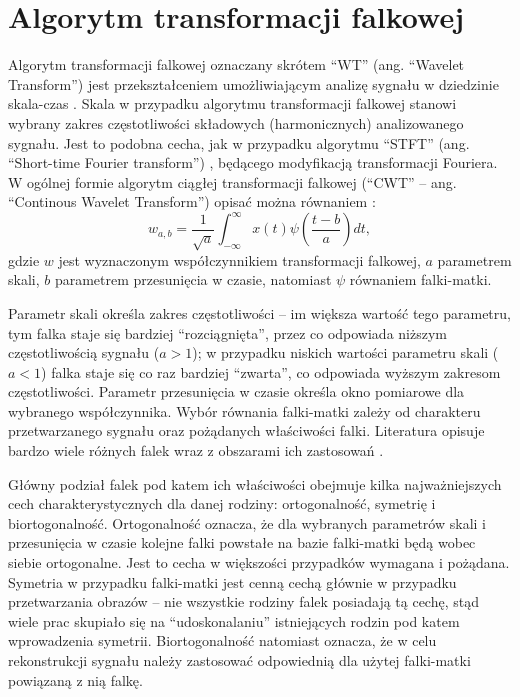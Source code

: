\chapter{Algorytm transformacji falkowej}

Algorytm transformacji falkowej oznaczany skrótem \enquote{WT} (ang. \enquote{Wavelet Transform}) jest przekształceniem umożliwiającym analizę sygnału w dziedzinie skala-czas \cite{wallen_handbook}. Skala w przypadku algorytmu transformacji falkowej stanowi wybrany zakres częstotliwości składowych (harmonicznych) analizowanego sygnału. Jest to podobna cecha, jak w przypadku algorytmu \enquote{STFT} (ang. \enquote{Short-time Fourier transform}) \cite{durak_sftp}, będącego modyfikacją transformacji Fouriera. W ogólnej formie algorytm ciągłej transformacji falkowej (\enquote{CWT} -- ang. \enquote{Continous Wavelet Transform}) opisać można równaniem \cite{lord_guide, wallen_handbook}:
\begin{equation}
w_{a,b} = \frac{1}{\sqrt{a}} \int _{-\infty} ^{\infty} { x(t) \psi \left( \frac{t-b}{a} \right) } dt \label{eqn_cwt},
\end{equation}
gdzie $w$ jest wyznaczonym współczynnikiem transformacji falkowej, $a$ parametrem skali, $b$ parametrem przesunięcia w czasie, natomiast $\psi$ równaniem falki-matki.

Parametr skali określa zakres częstotliwości -- im większa wartość tego parametru, tym falka staje się bardziej \enquote{rozciągnięta}, przez co odpowiada niższym częstotliwością sygnału ($a > 1$); w przypadku niskich wartości parametru skali ($a < 1$) falka staje się co raz bardziej \enquote{zwarta}, co odpowiada wyższym zakresom częstotliwości. Parametr przesunięcia w czasie określa okno pomiarowe dla wybranego współczynnika. Wybór równania falki-matki zależy od charakteru przetwarzanego sygnału oraz pożądanych właściwości falki. Literatura opisuje bardzo wiele różnych falek wraz z obszarami ich zastosowań \cite{wallen_handbook, akujuobi_applications}.

Główny podział falek pod katem ich właściwości obejmuje kilka najważniejszych cech charakterystycznych dla danej rodziny: ortogonalność, symetrię i biortogonalność. Ortogonalność oznacza, że dla wybranych parametrów skali i przesunięcia w czasie kolejne falki powstałe na bazie falki-matki będą wobec siebie ortogonalne. Jest to cecha w większości przypadków wymagana i pożądana. Symetria w przypadku falki-matki jest cenną cechą głównie w przypadku przetwarzania obrazów -- nie wszystkie rodziny falek posiadają tą cechę, stąd wiele prac skupiało się na \enquote{udoskonalaniu} istniejących rodzin pod katem wprowadzenia symetrii. Biortogonalność natomiast oznacza, że w celu rekonstrukcji sygnału należy zastosować odpowiednią dla użytej falki-matki powiązaną z nią falkę.

